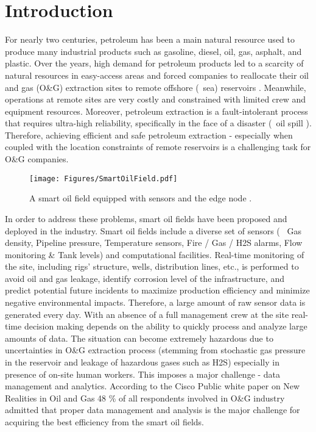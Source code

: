 \section{Introduction}\label{introduction}
For nearly two centuries, petroleum has been a main natural resource used to produce many industrial products such as gasoline, diesel, oil, gas, asphalt, and plastic. Over the years, high demand for petroleum products led to a scarcity of natural resources in easy-access areas and forced companies to reallocate their oil and gas (O\&G) extraction sites to remote offshore (\eg~sea) reservoirs \cite{sof3}. Meanwhile, operations at remote sites are very costly and constrained with limited crew and equipment resources. Moreover, petroleum extraction is a fault-intolerant process that requires ultra-high reliability, specifically in the face of a disaster (\eg~oil spill \cite{FINGAS20149}). Therefore, achieving efficient and safe petroleum extraction - especially when coupled with the location constraints of remote reservoirs is a challenging task for O\&G companies.

\begin{figure}[h!]
	\texttt{[image: Figures/SmartOilField.pdf]}
	\caption{A smart oil field equipped with sensors and the edge node .\label{fig:scen}}
\end{figure}

In order to address these problems, smart oil fields have been proposed and deployed in the industry. Smart oil fields include a diverse set of sensors (\eg~ Gas density, Pipeline pressure, Temperature sensors, Fire / Gas / H2S alarms, Flow monitoring \& Tank levels) and computational facilities. Real-time monitoring of the site, including rigs' structure, wells, distribution lines, etc., is performed to avoid oil and gas leakage, identify corrosion level of the infrastructure, and predict potential future incidents to maximize production efficiency and minimize negative environmental impacts. Therefore, a large amount of raw sensor data is generated every day. With an absence of a full management crew at the site real-time decision making depends on the ability to quickly process and analyze large amounts of data. The situation can become extremely hazardous due to uncertainties in O\&G extraction process (stemming from stochastic gas pressure in the reservoir and leakage of hazardous gases such as H2S) especially in presence of on-site human workers. This imposes a major challenge - data management and analytics. According to the Cisco Public white paper on New Realities in Oil and Gas\cite{Cisco} 48 \% of all respondents involved in O\&G industry admitted that proper data management and analysis is the major challenge for acquiring the best efficiency from the smart oil fields.

